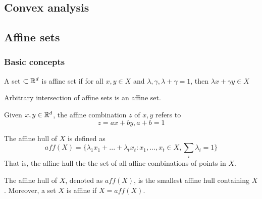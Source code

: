 
\begin{refsection}
\startcontents[chapters]	
\chapter{Convex analysis}\label{ch:convex-analysis}
\section{Affine sets}
\subsection{Basic concepts}
\begin{definition}
A set $\subset \mathbb{R}^d$ is affine set if for all $x,y\in X$ and $\lambda, \gamma, \lambda + \gamma = 1$, then $\lambda x + \gamma y \in X$
\end{definition}


\begin{lemma}
Arbitrary intersection of affine sets is an affine set.
\end{lemma}


\begin{definition} 
	Given $x,y\in \mathbb{R}^d$, the affine combination $z$ of $x,y$ refers to
	$$z=ax+by,a+b=1$$
\end{definition}


\begin{definition}
The affine hull of $X$ is defined as 
		$$aff(X) = \{\lambda_1 x_1 + ... + \lambda_t x_t: x_1,...,x_t\in X, \sum_i \lambda_i = 1\} $$
		That is, the affine hull the the set of all affine combinations of points in $X$.
\end{definition}

\begin{lemma}
The affine hull of $X$, denoted as $aff(X)$, is the smallest affine hull containing $X$. Moreover, a set $X$ is affine if $X = aff(X)$.
\end{lemma}





\end{refsection}

